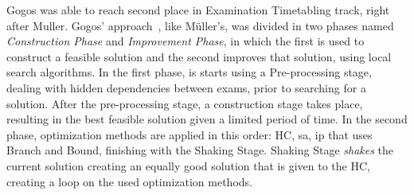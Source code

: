 Gogos was able to reach second place in Examination Timetabling track, right after Muller. Gogos' approach~\cite{Gogos2012}, like M\"{u}ller's, was divided in two phases named \textit{Construction Phase} and \textit{Improvement Phase}, in which the first is used to construct a feasible solution and the second improves that solution, using local search algorithms. In the first phase, is starts using a Pre-processing stage, dealing with hidden dependencies between exams, prior to searching for a solution. 
After the pre-processing stage, a construction stage takes place, resulting in the best feasible solution given a limited period of time. 
In the second phase, optimization methods are applied in this order: HC, \gls{sa}, \gls{ip} that uses Branch and Bound, finishing with the Shaking Stage. Shaking Stage \textit{shakes} the current solution creating an equally good solution that is given to the HC, creating a loop on the used optimization methods.\\


